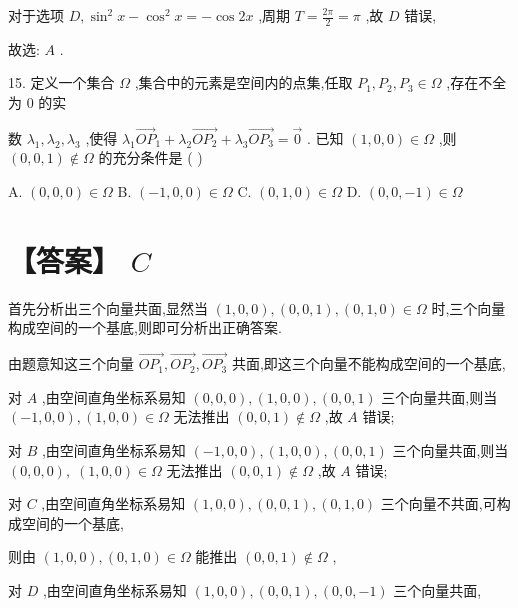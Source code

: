 \documentclass[10pt]{article}
\begin{document}
对于选项 \(D,{\sin }^{2}x - {\cos }^{2}x =  - \cos {2x}\) ,周期 \(T = \frac{2\pi }{2} = \pi\) ,故 \(D\) 错误,

故选: \(A\) .

15. 定义一个集合 \(\Omega\) ,集合中的元素是空间内的点集,任取 \({P}_{1},{P}_{2},{P}_{3} \in  \Omega\) ,存在不全为 0 的实

数 \({\lambda }_{1},{\lambda }_{2},{\lambda }_{3}\) ,使得 \({\lambda }_{1}{\overrightarrow{OP}}_{1} + {\lambda }_{2}\overrightarrow{O{P}_{2}} + {\lambda }_{3}\overrightarrow{O{P}_{3}} = \overrightarrow{0}\) . 已知 \(\left( {1,0,0}\right)  \in  \Omega\) ,则 \(\left( {0,0,1}\right)  \notin  \Omega\) 的充分条件是 ( )

A. \(\left( {0,0,0}\right)  \in  \Omega\) B. \(\left( {-1,0,0}\right)  \in  \Omega\) C. \(\left( {0,1,0}\right)  \in  \Omega\) D. \(\left( {0,0, - 1}\right)  \in  \Omega\)

\section*{【答案】 \(C\)}

首先分析出三个向量共面,显然当 \(\left( {1,0,0}\right) ,\left( {0,0,1}\right) ,\left( {0,1,0}\right)  \in  \Omega\) 时,三个向量构成空间的一个基底,则即可分析出正确答案.

由题意知这三个向量 \(\overrightarrow{O{P}_{1}},\overrightarrow{O{P}_{2}},\overrightarrow{O{P}_{3}}\) 共面,即这三个向量不能构成空间的一个基底,

对 \(A\) ,由空间直角坐标系易知 \(\left( {0,0,0}\right) ,\left( {1,0,0}\right) ,\left( {0,0,1}\right)\) 三个向量共面,则当 \(\left( {-1,0,0}\right) ,\left( {1,0,0}\right)  \in  \Omega\) 无法推出 \(\left( {0,0,1}\right)  \notin  \Omega\) ,故 \(A\) 错误;

对 \(B\) ,由空间直角坐标系易知 \(\left( {-1,0,0}\right) ,\left( {1,0,0}\right) ,\left( {0,0,1}\right)\) 三个向量共面,则当 \(\left( {0,0,0}\right) ,\;\left( {1,0,0}\right)  \in  \Omega\) 无法推出 \(\left( {0,0,1}\right)  \notin  \Omega\) ,故 \(A\) 错误;

对 \(C\) ,由空间直角坐标系易知 \(\left( {1,0,0}\right) ,\left( {0,0,1}\right) ,\left( {0,1,0}\right)\) 三个向量不共面,可构成空间的一个基底,

则由 \(\left( {1,0,0}\right) ,\left( {0,1,0}\right)  \in  \Omega\) 能推出 \(\left( {0,0,1}\right)  \notin  \Omega\) ,

对 \(D\) ,由空间直角坐标系易知 \(\left( {1,0,0}\right) ,\left( {0,0,1}\right) ,\left( {0,0, - 1}\right)\) 三个向量共面,
\end{document}
